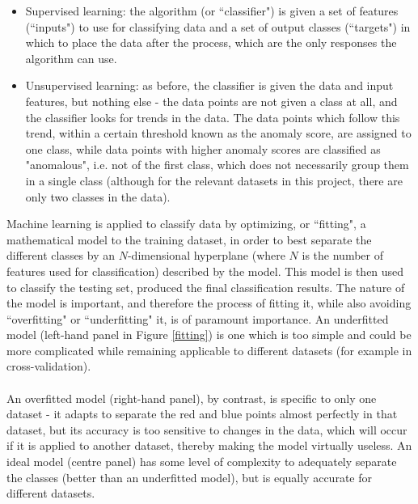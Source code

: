 \documentclass[12pt]{article}
\begin{document}
\begin{itemize}
\item Supervised learning: the algorithm (or ``classifier") is given a set of features (``inputs") to use for classifying data and a set of output classes (``targets") in which to place the data after the process, which are the only responses the algorithm can use.

\item Unsupervised learning: as before, the classifier is given the data and input features, but nothing else - the data points are not given a class at all, and the classifier looks for trends in the data. The data points which follow this trend, within a certain threshold known as the anomaly score, are assigned to one class, while data points with higher anomaly scores are classified as "anomalous", i.e. not of the first class, which does not necessarily group them in a single class (although for the relevant datasets in this project, there are only two classes in the data).

\end{itemize}

Machine learning is applied to classify data by optimizing, or ``fitting", a mathematical model to the training dataset, in order to best separate the different classes by an $N$-dimensional hyperplane (where $N$ is the number of features used for classification) described by the model. This model is then used to classify the testing set, produced the final classification results. The nature of the model is important, and therefore the process of fitting it, while also avoiding ``overfitting" or ``underfitting" it, is of paramount importance. An underfitted model (left-hand panel in Figure \ref{fitting}) is one which is too simple and could be more complicated while remaining applicable to different datasets (for example in cross-validation).
\paragraph{}
An overfitted model (right-hand panel), by contrast, is specific to only one dataset - it adapts to separate the red and blue points almost perfectly in that dataset, but its accuracy is too sensitive to changes in the data, which will occur if it is applied to another dataset, thereby making the model virtually useless. An ideal model (centre panel) has some level of complexity to adequately separate the classes (better than an underfitted model), but is equally accurate for different datasets.
\end{document}
